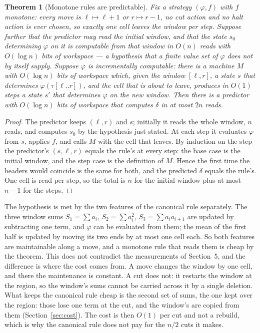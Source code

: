 \documentclass[11pt]{article}
\newtheorem{theorem}{Theorem}
\begin{document}
\begin{theorem}[Monotone rules are predictable]\label{thm:monotone}
Fix a strategy $(\varphi,f)$ with $f$ monotone: every move is $\ell\mapsto\ell+1$ or $r\mapsto r-1$,
no cut action and no halt action is ever chosen, so
exactly one cell leaves the window per step. Suppose further that the predictor may read the initial window, and that the state $s_0$ determining
$\varphi$ on it is computable from that window in $O(n)$ reads with $O(\log n)$ bits of workspace ---
a hypothesis that a finite value set of $\varphi$ does not by itself supply. Suppose $\varphi$ is
\emph{incrementally computable}:
there is a machine $M$ with $O(\log n)$ bits of workspace which, given the window $[\ell,r]$, a state
$s$ that determines $\varphi(\tau[\ell..r])$, and the cell that is about to leave, produces in $O(1)$
steps a state $s'$ that determines $\varphi$ on the new window. Then there is a predictor with
$O(\log n)$ bits of workspace that computes $\delta$ in at most $2n$ reads.
\end{theorem}

\begin{proof}
The predictor keeps $(\ell,r)$ and $s$; initially it reads the whole window, $n$ reads, and computes
$s_0$ by the hypothesis just stated. At each step it evaluates $\varphi$ from $s$, applies $f$, and calls $M$ with the cell that
leaves. By induction on the step the predictor's $(s,\ell,r)$ equals the rule's at every step: the
base case is the initial window, and the step case is the definition of $M$. Hence the first time the
headers would coincide is the same for both, and the predicted $\delta$ equals the rule's. One cell
is read per step, so the total is $n$ for the initial window plus at most $n-1$ for the steps.
\end{proof}

The hypothesis is met by the two features of the canonical rule separately. The three window sums
$S_1=\sum a_i$, $S_2=\sum a_i^2$, $S_3=\sum a_ia_{i+1}$ are updated by subtracting one term, and
$\varphi$ can be evaluated from them; the mean of the first half is updated by moving its two ends by
at most one cell each. So both features are maintainable along a move, and a monotone rule that
reads them is cheap by the theorem.
This does not contradict the measurements of Section~5, and the difference is where the cost comes
from. A move changes the window by one cell, and there the maintenance is constant. A cut does not:
it restarts the window at the region, so the window's sums cannot be carried across it by a single
deletion. What keeps the canonical rule cheap is the second set of sums, the one kept over the
region: those lose one term at the cut, and the window's are copied from them
(Section~\ref{sec:cost}). The cost is then $O(1)$ per cut and not a rebuild, which is why the
canonical rule does not pay for the $n/2$ cuts it makes.
\end{document}
